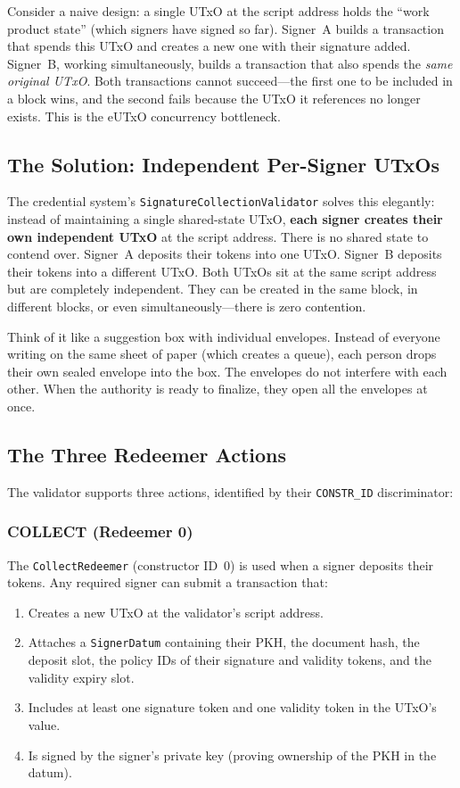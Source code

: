 Consider a naive design: a single UTxO at the script address holds the
``work product state'' (which signers have signed so far). Signer~A
builds a transaction that spends this UTxO and creates a new one with
their signature added. Signer~B, working simultaneously, builds a
transaction that also spends the \emph{same original UTxO}. Both
transactions cannot succeed---the first one to be included in a block
wins, and the second fails because the UTxO it references no longer
exists. This is the eUTxO concurrency bottleneck.

\subsection{The Solution: Independent Per-Signer UTxOs}

The credential system's \texttt{SignatureCollectionValidator} solves
this elegantly: instead of maintaining a single shared-state UTxO,
\textbf{each signer creates their own independent UTxO} at the script
address. There is no shared state to contend over. Signer~A deposits
their tokens into one UTxO. Signer~B deposits their tokens into a
different UTxO. Both UTxOs sit at the same script address but are
completely independent. They can be created in the same block, in
different blocks, or even simultaneously---there is zero contention.

Think of it like a suggestion box with individual envelopes. Instead of
everyone writing on the same sheet of paper (which creates a queue),
each person drops their own sealed envelope into the box. The envelopes
do not interfere with each other. When the authority is ready to
finalize, they open all the envelopes at once.

\subsection{The Three Redeemer Actions}

The validator supports three actions, identified by their
\texttt{CONSTR\_ID} discriminator:

\subsubsection{COLLECT (Redeemer 0)}

The \texttt{CollectRedeemer} (constructor ID~0) is used when a signer
deposits their tokens. Any required signer can submit a transaction
that:
\begin{enumerate}[nosep]
  \item Creates a new UTxO at the validator's script address.
  \item Attaches a \texttt{SignerDatum} containing their PKH, the
    document hash, the deposit slot, the policy IDs of their signature
    and validity tokens, and the validity expiry slot.
  \item Includes at least one signature token and one validity token in
    the UTxO's value.
  \item Is signed by the signer's private key (proving ownership of the
    PKH in the datum).
\end{enumerate}

